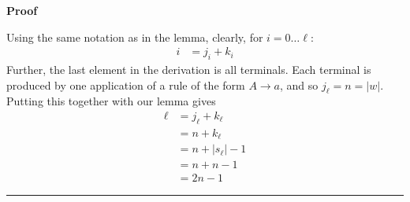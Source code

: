 \documentclass{article}
\begin{document}
\begin{enumerate}
  {\bf Proof}

Using the same notation as in the lemma, clearly, for $i=0\ldots \ell$:
  \begin{align}
    i &= j_i + k_i
  \end{align}
Further, the last element in the derivation is all terminals.  Each
terminal is produced by one application of a rule of the form
$A\rightarrow a$, and so $j_{\ell} = n = |w|$.  Putting this together
with our lemma gives
  \begin{align}
    \ell  &= j_{\ell} + k_{\ell}\\
    &= n + k_{\ell}\\
    &= n + |s_\ell| - 1\\
    &= n + n - 1\\
    &= 2n-1
  \end{align}
\hfill
  \rule{1em}{1em}      



\end{enumerate}
\end{document}
